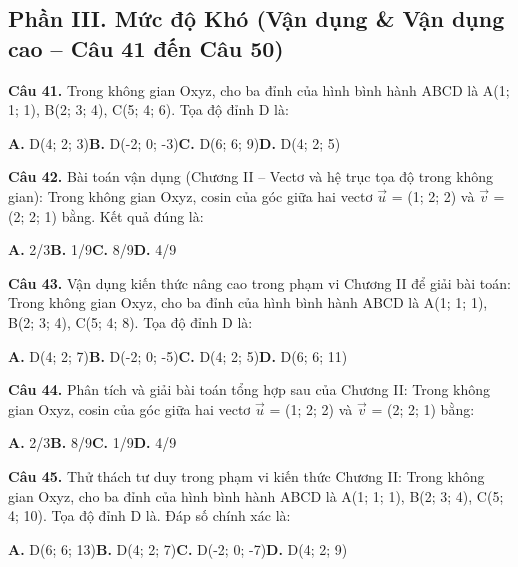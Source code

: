\documentclass[11pt,a4paper]{article}
\begin{document}
\subsection*{\color{accent} Phần III. Mức độ Khó (Vận dụng \& Vận dụng cao -- Câu 41 đến Câu 50)}
\textbf{\color{primary} Câu 41.} Trong không gian Oxyz, cho ba đỉnh của hình bình hành ABCD là A(1; 1; 1), B(2; 3; 4), C(5; 4; 6). Tọa độ đỉnh D là:\par
\hspace*{1.5em}\textbf{A.} D(4; 2; 3)\quad\quad \textbf{B.} D(-2; 0; -3)\quad\quad \textbf{C.} D(6; 6; 9)\quad\quad \textbf{D.} D(4; 2; 5)\par\vspace{2pt}
\textbf{\color{primary} Câu 42.} Bài toán vận dụng (Chương II – Vectơ và hệ trục tọa độ trong không gian): Trong không gian Oxyz, cosin của góc giữa hai vectơ $\vec{u}$ = (1; 2; 2) và $\vec{v}$ = (2; 2; 1) bằng. Kết quả đúng là:\par
\hspace*{1.5em}\textbf{A.} 2/3\quad\quad \textbf{B.} 1/9\quad\quad \textbf{C.} 8/9\quad\quad \textbf{D.} 4/9\par\vspace{2pt}
\textbf{\color{primary} Câu 43.} Vận dụng kiến thức nâng cao trong phạm vi Chương II để giải bài toán: Trong không gian Oxyz, cho ba đỉnh của hình bình hành ABCD là A(1; 1; 1), B(2; 3; 4), C(5; 4; 8). Tọa độ đỉnh D là:\par
\hspace*{1.5em}\textbf{A.} D(4; 2; 7)\quad\quad \textbf{B.} D(-2; 0; -5)\quad\quad \textbf{C.} D(4; 2; 5)\quad\quad \textbf{D.} D(6; 6; 11)\par\vspace{2pt}
\textbf{\color{primary} Câu 44.} Phân tích và giải bài toán tổng hợp sau của Chương II: Trong không gian Oxyz, cosin của góc giữa hai vectơ $\vec{u}$ = (1; 2; 2) và $\vec{v}$ = (2; 2; 1) bằng:\par
\hspace*{1.5em}\textbf{A.} 2/3\quad\quad \textbf{B.} 8/9\quad\quad \textbf{C.} 1/9\quad\quad \textbf{D.} 4/9\par\vspace{2pt}
\textbf{\color{primary} Câu 45.} Thử thách tư duy trong phạm vi kiến thức Chương II: Trong không gian Oxyz, cho ba đỉnh của hình bình hành ABCD là A(1; 1; 1), B(2; 3; 4), C(5; 4; 10). Tọa độ đỉnh D là. Đáp số chính xác là:\par
\hspace*{1.5em}\textbf{A.} D(6; 6; 13)\quad\quad \textbf{B.} D(4; 2; 7)\quad\quad \textbf{C.} D(-2; 0; -7)\quad\quad \textbf{D.} D(4; 2; 9)\par\vspace{2pt}
\end{document}
